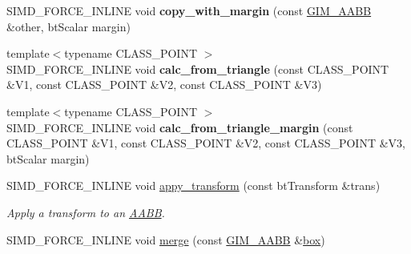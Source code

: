 \begin{DoxyCompactItemize}
\item 
\hypertarget{class_g_i_m___a_a_b_b_a216e7f2c10a5cf26db9f2da43cfc91d6}{S\+I\+M\+D\+\_\+\+F\+O\+R\+C\+E\+\_\+\+I\+N\+L\+I\+N\+E void {\bfseries copy\+\_\+with\+\_\+margin} (const \hyperlink{class_g_i_m___a_a_b_b}{G\+I\+M\+\_\+\+A\+A\+B\+B} \&other, bt\+Scalar margin)}\label{class_g_i_m___a_a_b_b_a216e7f2c10a5cf26db9f2da43cfc91d6}

\item 
\hypertarget{class_g_i_m___a_a_b_b_acc278ddfe507da3a10cfe1b575454939}{{\footnotesize template$<$typename C\+L\+A\+S\+S\+\_\+\+P\+O\+I\+N\+T $>$ }\\S\+I\+M\+D\+\_\+\+F\+O\+R\+C\+E\+\_\+\+I\+N\+L\+I\+N\+E void {\bfseries calc\+\_\+from\+\_\+triangle} (const C\+L\+A\+S\+S\+\_\+\+P\+O\+I\+N\+T \&V1, const C\+L\+A\+S\+S\+\_\+\+P\+O\+I\+N\+T \&V2, const C\+L\+A\+S\+S\+\_\+\+P\+O\+I\+N\+T \&V3)}\label{class_g_i_m___a_a_b_b_acc278ddfe507da3a10cfe1b575454939}

\item 
\hypertarget{class_g_i_m___a_a_b_b_a01e3fb3fe6955ea31b657fa765c73c7a}{{\footnotesize template$<$typename C\+L\+A\+S\+S\+\_\+\+P\+O\+I\+N\+T $>$ }\\S\+I\+M\+D\+\_\+\+F\+O\+R\+C\+E\+\_\+\+I\+N\+L\+I\+N\+E void {\bfseries calc\+\_\+from\+\_\+triangle\+\_\+margin} (const C\+L\+A\+S\+S\+\_\+\+P\+O\+I\+N\+T \&V1, const C\+L\+A\+S\+S\+\_\+\+P\+O\+I\+N\+T \&V2, const C\+L\+A\+S\+S\+\_\+\+P\+O\+I\+N\+T \&V3, bt\+Scalar margin)}\label{class_g_i_m___a_a_b_b_a01e3fb3fe6955ea31b657fa765c73c7a}

\item 
\hypertarget{class_g_i_m___a_a_b_b_adeb95bf6a8b4d0281b35adf33fbbfbdc}{S\+I\+M\+D\+\_\+\+F\+O\+R\+C\+E\+\_\+\+I\+N\+L\+I\+N\+E void \hyperlink{class_g_i_m___a_a_b_b_adeb95bf6a8b4d0281b35adf33fbbfbdc}{appy\+\_\+transform} (const bt\+Transform \&trans)}\label{class_g_i_m___a_a_b_b_adeb95bf6a8b4d0281b35adf33fbbfbdc}

\begin{DoxyCompactList}\small\item\em Apply a transform to an \hyperlink{class_a_a_b_b}{A\+A\+B\+B}. \end{DoxyCompactList}\item 
\hypertarget{class_g_i_m___a_a_b_b_a75e41aceb9b1e8f4b90e702dcec19c13}{S\+I\+M\+D\+\_\+\+F\+O\+R\+C\+E\+\_\+\+I\+N\+L\+I\+N\+E void \hyperlink{class_g_i_m___a_a_b_b_a75e41aceb9b1e8f4b90e702dcec19c13}{merge} (const \hyperlink{class_g_i_m___a_a_b_b}{G\+I\+M\+\_\+\+A\+A\+B\+B} \&\hyperlink{structbox}{box})}\label{class_g_i_m___a_a_b_b_a75e41aceb9b1e8f4b90e702dcec19c13}


\end{DoxyCompactItemize}
